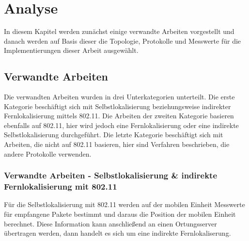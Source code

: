 \chapter{Analyse}
\label{ch:Analyse}
In diesem Kapitel werden zunächst einige verwandte Arbeiten vorgestellt und danach werden auf Basis dieser die Topologie, Protokolle und Messwerte für die Implementierungen dieser Arbeit ausgewählt.

\section{Verwandte Arbeiten} 
Die verwandten Arbeiten wurden in drei Unterkategorien unterteilt. 
Die erste Kategorie beschäftigt sich mit Selbstlokalisierung beziehungsweise indirekter Fernlokalisierung mittels 802.11.
Die Arbeiten der zweiten Kategorie basieren ebenfalls auf 802.11, hier wird jedoch eine Fernlokalisierung oder eine indirekte Selbstlokalisierung durchgeführt.
Die letzte Kategorie beschäftigt sich mit Arbeiten, die nicht auf 802.11 basieren, hier sind Verfahren beschrieben, die andere Protokolle verwenden.

\subsection{Verwandte Arbeiten - Selbstlokalisierung \& indirekte Fernlokalisierung mit 802.11}
Für die Selbstlokalisierung mit 802.11 werden auf der mobilen Einheit Messwerte für empfangene Pakete bestimmt und daraus die Position der mobilen Einheit berechnet.
Diese Information kann anschließend an einen Ortungsserver übertragen werden, dann handelt es sich um eine indirekte Fernlokaliserung.

